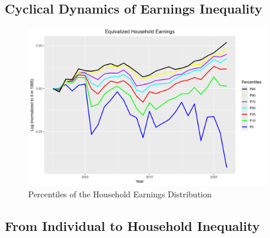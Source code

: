 \documentclass{article}
\begin{document}
\subsection{Cyclical Dynamics of Earnings Inequality}

\begin{figure}
    \centering
    \includegraphics[width=0.95\textwidth]{figures/Fig_2/Fig_2_percentiles_a1995.png}
    \caption{Percentiles of the Household Earnings Distribution}
    \label{fig:earnings_inequality_cyclic}
\end{figure}

\subsection{From Individual to Household Inequality}
\end{document}
